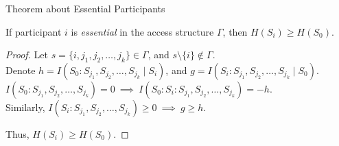 \documentclass[
handout,
aspectratio=169]{beamer}
\newcommand{\seqn}[2]{{#1}_1,{#1}_2,\dotsc,{#1}_{#2}}
\newcommand{\seqin}[3]{{#1}_{{#2}_1},{#1}_{{#2}_2},\dotsc,{#1}_{{#2}_{#3}}}
\begin{document}
\begin{frame}{Theorem about Essential Participants}
    \begin{theorem}
        If participant $i$ is \emph{essential} in the access structure $\Gamma$, then $H(S_i) \ge H(S_0)$.
    \end{theorem}

    \begin{proof}
        Let $s=\{i, \seqn{j}{k}\} \in \Gamma$, and $s \setminus \{i\} \not\in \Gamma$.\\
        Denote $h = I(S_0 : \seqin{S}{j}{k} \mid S_i)$,
        and $g = I(S_i : \seqin{S}{j}{k} \mid S_0)$.\\
        $I(S_0 : \seqin{S}{j}{k}) = 0\ \implies\ I(S_0 : S_i : \seqin{S}{j}{k}) = -h$.\\
        Similarly, $I(S_i : \seqin{S}{j}{k}) \ge 0 \ \implies\ g \ge h$.

        \begin{center}
        \end{center}
        Thus, $H(S_i) \ge H(S_0)$.
    \end{proof}

\end{frame}
\end{document}
